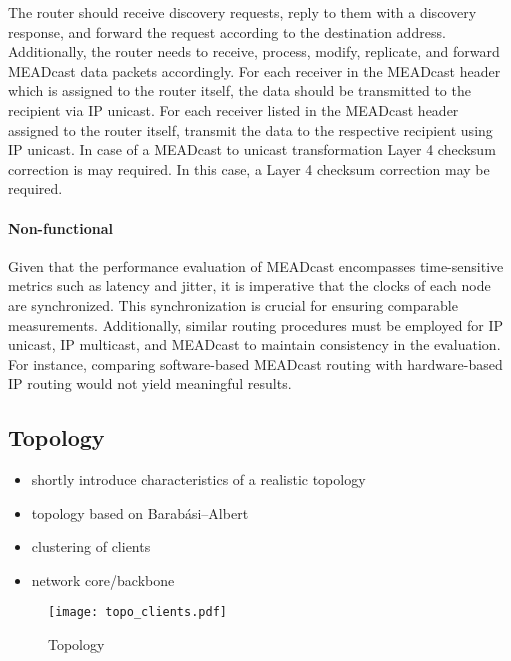 The router should receive discovery requests, reply to them with a discovery
    response, and forward the request according to the destination address.
Additionally, the router needs to receive, process, modify, replicate, and
    forward MEADcast data packets accordingly.
For each receiver in the MEADcast header which is assigned to the router
    itself, the data should be transmitted to the recipient via IP unicast.
For each receiver listed in the MEADcast header assigned to the router itself,
    transmit the data to the respective recipient using IP unicast.
In case of a MEADcast to unicast transformation Layer 4 checksum correction is
    may required.
In this case, a Layer 4 checksum correction may be required.

\paragraph{Non-functional} %
\label{par:Non-functional}
Given that the performance evaluation of MEADcast encompasses time-sensitive
    metrics such as latency and jitter, it is imperative that the clocks of
    each node are synchronized.
This synchronization is crucial for ensuring comparable measurements.
Additionally, similar routing procedures must be employed for IP unicast, IP
    multicast, and MEADcast to maintain consistency in the evaluation.
For instance, comparing software-based MEADcast routing with hardware-based IP
    routing would not yield meaningful results.

\subsection{Topology} %
\label{sub:03_Topology}
\begin{itemize}
    \item shortly introduce characteristics of a realistic topology
    \item topology based on Barabási–Albert
    \item clustering of clients
    \item network core/backbone
\end{itemize}
\begin{figure}
    \begin{center}
        \texttt{[image: topo\_clients.pdf]}
    \end{center}
    \caption{Topology}
    \label{fig:topology}
\end{figure}


